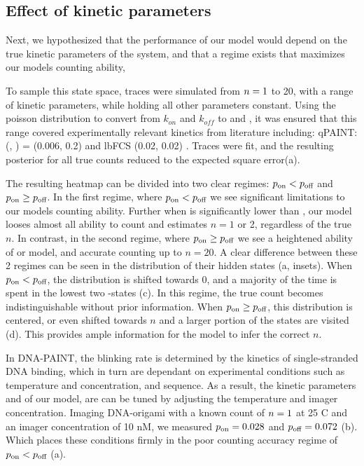 \subsection{Effect of kinetic parameters}
Next, we hypothesized that the performance of our model would depend on the true kinetic parameters of the system, 
and that a regime exists that maximizes our models counting ability, 

To sample this state space, traces were simulated from $n=1$ to 20, with a range of kinetic parameters, 
while holding all other parameters constant.
	Using the poisson distribution to convert from $k_{on}$ and $k_{off}$ to \pon and \poff,
	it was ensured that this range covered experimentally relevant kinetics from literature including:
	qPAINT: (\pon, \poff) = (0.006, 0.2) \cite{jungmann_2016} and lbFCS (0.02, 0.02) \cite{stein_2021}. 
	Traces were fit, and the resulting posterior for all true counts reduced to the expected 
	square error(a).

The resulting heatmap can be divided into two clear regimes: $p_\text{on} < p_\text{off}$ and $p_\text{on} \geq p_\text{off}$.
	In the first regime, where $p_\text{on} < p_\text{off}$ we see significant limitations to our models counting ability.
	Further when \pon is significantly lower than \poff, our model looses almost 
	all ability to count and estimates $n=1$ or 2, regardless of the true $n$.
	In contrast, in the second regime, where $p_\text{on} \geq p_\text{off}$ we see a heightened ability of or model, 
	and accurate counting up to $n=20$.
	A clear difference between these 2 regimes can be seen in the distribution 
	of their hidden states \z (a, insets).
	When $p_\text{on} < p_\text{off}$, the distribution is shifted towards 0, and a majority 
	of the time is spent in the lowest two \z{}-states (c). 
	In this regime, the true count becomes indistinguishable without prior information. 
	When $p_\text{on} \geq p_\text{off}$, this distribution is centered, or even shifted towards $n$ 
	and a larger portion of the states are visited (d). 
	This provides ample information for the model to infer the correct $n$.
	
In DNA-PAINT, the blinking rate is determined by the kinetics of single-stranded DNA binding,
which in turn are dependant on experimental conditions such as temperature and concentration, and sequence.
	As a result, the kinetic parameters \pon and \poff of our model, are can be 
	tuned by adjusting the temperature and imager concentration.
	Imaging DNA-origami with a known count of $n=1$ at 25 C and an 
	imager concentration of 10 nM, we measured $p_\text{on}=0.028$ and $p_\text{off}=0.072$ 
	(b).
	Which places these conditions firmly in the poor counting 
	accuracy regime of $p_\text{on} < p_\text{off}$ (a). %
	
